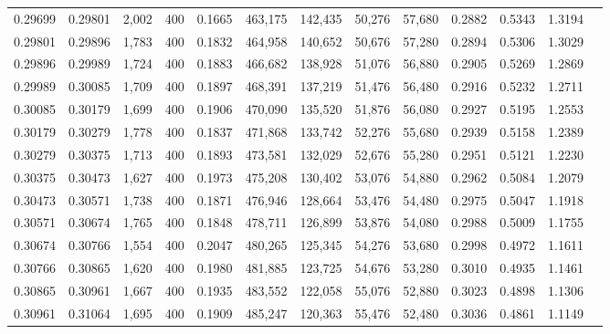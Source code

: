 \begin{tabular}{rrrrrrrrrrrrr}
0.29699 & 0.29801 &  2,002 & 400 &                                     0.1665 & 463,175 & 142,435 &  50,276 &  57,680 & 0.2882 & 0.5343 & 1.3194 \\
0.29801 & 0.29896 &  1,783 & 400 &                                     0.1832 & 464,958 & 140,652 &  50,676 &  57,280 & 0.2894 & 0.5306 & 1.3029 \\
0.29896 & 0.29989 &  1,724 & 400 &                                     0.1883 & 466,682 & 138,928 &  51,076 &  56,880 & 0.2905 & 0.5269 & 1.2869 \\
0.29989 & 0.30085 &  1,709 & 400 &                                     0.1897 & 468,391 & 137,219 &  51,476 &  56,480 & 0.2916 & 0.5232 & 1.2711 \\
0.30085 & 0.30179 &  1,699 & 400 &                                     0.1906 & 470,090 & 135,520 &  51,876 &  56,080 & 0.2927 & 0.5195 & 1.2553 \\
0.30179 & 0.30279 &  1,778 & 400 &                                     0.1837 & 471,868 & 133,742 &  52,276 &  55,680 & 0.2939 & 0.5158 & 1.2389 \\
0.30279 & 0.30375 &  1,713 & 400 &                                     0.1893 & 473,581 & 132,029 &  52,676 &  55,280 & 0.2951 & 0.5121 & 1.2230 \\
0.30375 & 0.30473 &  1,627 & 400 &                                     0.1973 & 475,208 & 130,402 &  53,076 &  54,880 & 0.2962 & 0.5084 & 1.2079 \\
0.30473 & 0.30571 &  1,738 & 400 &                                     0.1871 & 476,946 & 128,664 &  53,476 &  54,480 & 0.2975 & 0.5047 & 1.1918 \\
0.30571 & 0.30674 &  1,765 & 400 &                                     0.1848 & 478,711 & 126,899 &  53,876 &  54,080 & 0.2988 & 0.5009 & 1.1755 \\
0.30674 & 0.30766 &  1,554 & 400 &                                     0.2047 & 480,265 & 125,345 &  54,276 &  53,680 & 0.2998 & 0.4972 & 1.1611 \\
0.30766 & 0.30865 &  1,620 & 400 &                                     0.1980 & 481,885 & 123,725 &  54,676 &  53,280 & 0.3010 & 0.4935 & 1.1461 \\
0.30865 & 0.30961 &  1,667 & 400 &                                     0.1935 & 483,552 & 122,058 &  55,076 &  52,880 & 0.3023 & 0.4898 & 1.1306 \\
0.30961 & 0.31064 &  1,695 & 400 &                                     0.1909 & 485,247 & 120,363 &  55,476 &  52,480 & 0.3036 & 0.4861 & 1.1149 \\

\end{tabular}
